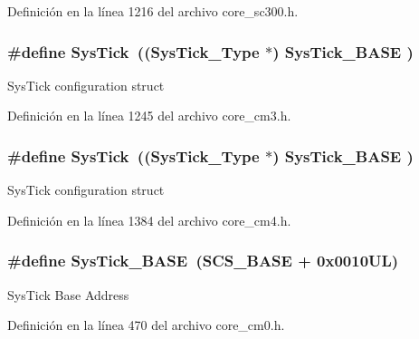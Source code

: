 Definición en la línea 1216 del archivo core\+\_\+sc300.\+h.

\subsubsection[{\texorpdfstring{Sys\+Tick}{SysTick}}]{\setlength{\rightskip}{0pt plus 5cm}\#define Sys\+Tick~(({\bf Sys\+Tick\+\_\+\+Type}   $\ast$)     {\bf Sys\+Tick\+\_\+\+B\+A\+SE}  )}\hypertarget{group___c_m_s_i_s__core__base_gacd96c53beeaff8f603fcda425eb295de}{}\label{group___c_m_s_i_s__core__base_gacd96c53beeaff8f603fcda425eb295de}
Sys\+Tick configuration struct 

Definición en la línea 1245 del archivo core\+\_\+cm3.\+h.

\subsubsection[{\texorpdfstring{Sys\+Tick}{SysTick}}]{\setlength{\rightskip}{0pt plus 5cm}\#define Sys\+Tick~(({\bf Sys\+Tick\+\_\+\+Type}   $\ast$)     {\bf Sys\+Tick\+\_\+\+B\+A\+SE}  )}\hypertarget{group___c_m_s_i_s__core__base_gacd96c53beeaff8f603fcda425eb295de}{}\label{group___c_m_s_i_s__core__base_gacd96c53beeaff8f603fcda425eb295de}
Sys\+Tick configuration struct 

Definición en la línea 1384 del archivo core\+\_\+cm4.\+h.

\subsubsection[{\texorpdfstring{Sys\+Tick\+\_\+\+B\+A\+SE}{SysTick_BASE}}]{\setlength{\rightskip}{0pt plus 5cm}\#define Sys\+Tick\+\_\+\+B\+A\+SE~({\bf S\+C\+S\+\_\+\+B\+A\+SE} +  0x0010\+U\+L)}\hypertarget{group___c_m_s_i_s__core__base_ga58effaac0b93006b756d33209e814646}{}\label{group___c_m_s_i_s__core__base_ga58effaac0b93006b756d33209e814646}
Sys\+Tick Base Address 

Definición en la línea 470 del archivo core\+\_\+cm0.\+h.

